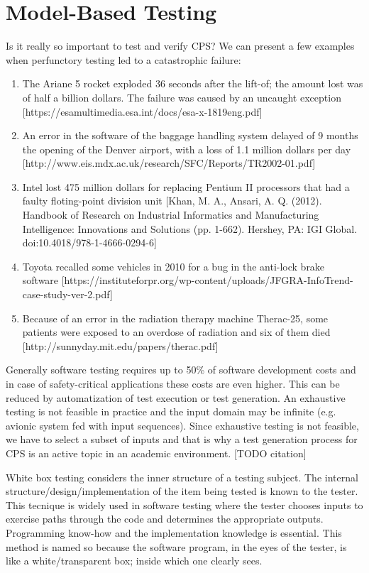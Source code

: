 \section{Model-Based Testing}

Is it really so important to test and verify CPS? We can present a few examples when perfunctory testing led to a catastrophic failure:

\begin{enumerate}
	\item The Ariane 5 rocket exploded 36 seconds after the lift-of; the amount lost was of half a billion dollars. The failure was caused by an uncaught exception [https://esamultimedia.esa.int/docs/esa-x-1819eng.pdf]
	\item An error in the software of the baggage handling system delayed of 9 months the opening of the Denver airport, with a loss of 1.1 million dollars per day [http://www.eis.mdx.ac.uk/research/SFC/Reports/TR2002-01.pdf]
	\item Intel lost 475 million dollars for replacing Pentium II processors that had a faulty floting-point division unit [Khan, M. A., Ansari, A. Q. (2012). Handbook of Research on Industrial Informatics and Manufacturing Intelligence: Innovations and Solutions (pp. 1-662). Hershey, PA: IGI Global. doi:10.4018/978-1-4666-0294-6]
	\item Toyota recalled some vehicles in 2010 for a bug in the anti-lock brake software [https://instituteforpr.org/wp-content/uploads/JFGRA-InfoTrend-case-study-ver-2.pdf]
	\item Because of an error in the radiation therapy machine Therac-25, some patients were exposed to an overdose of radiation and six of them died [http://sunnyday.mit.edu/papers/therac.pdf]
\end{enumerate}

Generally software testing requires up to 50\% of software development costs and in case of safety-critical applications these costs are even higher. This can be reduced by automatization of test execution or test generation. An exhaustive testing is not feasible in practice and the input domain may be infinite (e.g. avionic system fed with input sequences). Since exhaustive testing is not feasible, we have to select a subset of inputs and that is why a test generation process for CPS is an active topic in an academic environment. [TODO citation]

White box testing considers the inner structure of a testing subject. The internal structure/design/implementation of the item being tested is known to the tester. This tecnique is widely used in software testing where the tester chooses inputs to exercise paths through the code and determines the appropriate outputs. Programming know-how and the implementation knowledge is essential. This method is named so because the software program, in the eyes of the tester, is like a white/transparent box; inside which one clearly sees.

